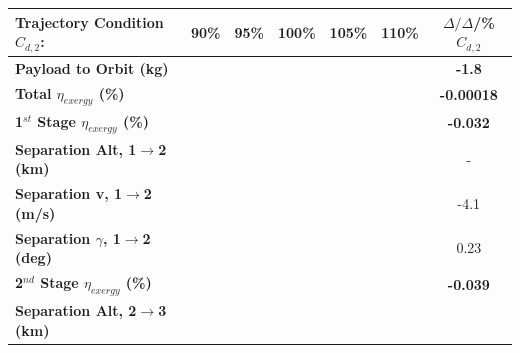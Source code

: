 \begin{table}[ht]%
	\centering
	\begin{tabular}{l c c c c c c} 
		\hline \textbf{Trajectory Condition}   \qquad  $C_{d,2}$:
		&90\%
		&95\%
		&100\%
		&105\%
		&110\%
		& $\Delta/\Delta$/\%$C_{d,2}$
		\\
		\hline \textbf{Payload to Orbit (kg)}
		& \textbf{\PayloadToOrbitCdNinety}
		& \textbf{\PayloadToOrbitCdNinetyFive}
		& \textbf{\PayloadToOrbitCdStandard}
		& \textbf{\PayloadToOrbitCdOneHundredFive}
		& \textbf{\PayloadToOrbitCdOneHundredTen}
		&\textbf{-1.8}
		\\
		\textbf{Total $\eta_{exergy}$ (\%)}
		& \textbf{\totalExergyEffCdNinety}
		& \textbf{\totalExergyEffCdNinetyFive}
		& \textbf{\totalExergyEffCdStandard}
		& \textbf{\totalExergyEffCdOneHundredFive}
		& \textbf{\totalExergyEffCdOneHundredTen}
		& \textbf{-0.00018}
		\\
		\hline 
		\textbf{1$^{st}$ Stage $\eta_{exergy}$ (\%)}
		& \textbf{\firstExergyEffCdNinety}
		& \textbf{\firstExergyEffCdNinetyFive}
		& \textbf{\firstExergyEffCdStandard}
		& \textbf{\firstExergyEffCdOneHundredFive}
		& \textbf{\firstExergyEffCdOneHundredTen}
		& \textbf{-0.032}
		\\
		\textbf{Separation Alt, 1$\rightarrow$2 (km)}
		& \firstsecondSeparationAltCdNinety
		& \firstsecondSeparationAltCdNinetyFive
		& \firstsecondSeparationAltCdStandard
		& \firstsecondSeparationAltCdOneHundredFive
		& \firstsecondSeparationAltCdOneHundredTen
		& -
		\\
		\textbf{Separation v, 1$\rightarrow$2 (m/s)}
		& \firstsecondSeparationvCdNinety
		& \firstsecondSeparationvCdNinetyFive
		& \firstsecondSeparationvCdStandard
		& \firstsecondSeparationvCdOneHundredFive
		& \firstsecondSeparationvCdOneHundredTen
		&-4.1
		\\
		\textbf{Separation $\gamma$, 1$\rightarrow$2 (deg)}
		& \firstsecondSeparationgammaCdNinety
		& \firstsecondSeparationgammaCdNinetyFive
		& \firstsecondSeparationgammaCdStandard
		& \firstsecondSeparationgammaCdOneHundredFive
		& \firstsecondSeparationgammaCdOneHundredTen
		&0.23
		\\
		\hline 
		\textbf{2$^{nd}$ Stage $\eta_{exergy}$ (\%)}
		& \textbf{\secondExergyEffCdNinety}
		& \textbf{\secondExergyEffCdNinetyFive}
		& \textbf{\secondExergyEffCdStandard}
		& \textbf{\secondExergyEffCdOneHundredFive}
		& \textbf{\secondExergyEffCdOneHundredTen}
		& \textbf{-0.039}
		\\
		\textbf{Separation Alt, 2$\rightarrow$3 (km)}

\end{tabular}
\end{table}

